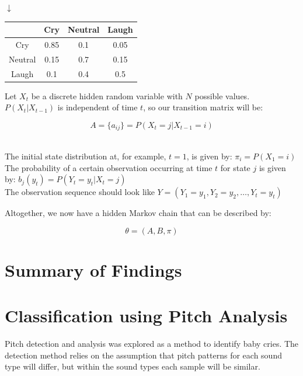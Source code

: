 \documentclass[paper=a4, fontsize=11pt]{scrartcl}
\numberwithin{equation}{section}
\numberwithin{figure}{section}
\numberwithin{table}{section}
\begin{document}
\centering $\downarrow$

\begin{center}
\begin{tabular}{ |c|c|c|c| } 
 \hline
       & Cry & Neutral & Laugh \\
 \hline
 Cry & 0.85 & 0.1 & 0.05 \\ 
 Neutral & 0.15 & 0.7 & 0.15 \\ 
 Laugh & 0.1 & 0.4 & 0.5 \\
 \hline
\end{tabular}
\end{center}

\justifying Let $X_t$ be a discrete hidden random variable with $N$ possible values. $P(X_t|X_{t-1})$ is independent of time $t$, so our transition matrix will be:

\begin{equation}
A = \{a_{ij}\} = P(X_t = j|X_{t-1} = i)
\end{equation}

\noindent \\ The initial state distribution at, for example, $t = 1$, is given by: $\boxed{\pi_i = P(X_1 = i)}$ \\

\noindent The probability of a certain observation occurring at time $t$ for state $j$ is given by: $\boxed{b_j(y_t) = P(Y_t = y_t|X_t = j)}$ \\

\noindent The observation sequence should look like $Y = (Y_1 = y_1, Y_2 = y_2, \ldots, Y_t = y_t)$

\noindent Altogether, we now have a hidden Markov chain that can be described by:

\begin{equation}
\boxed{\theta = (A, B, \pi)}
\end{equation}

\section{Summary of Findings}
\section{Classification using Pitch Analysis}
Pitch detection and analysis was explored as a method to identify baby cries. The detection method relies on the assumption that pitch patterns for each sound type will differ, but within the sound types each sample will be similar.
\end{document}
